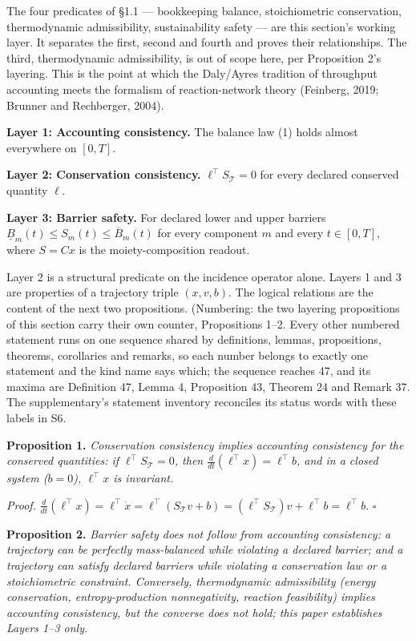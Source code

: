 \documentclass[11pt]{article}
\begin{document}
The four predicates of \S1.1 --- bookkeeping balance, stoichiometric conservation, thermodynamic admissibility, sustainability safety --- are this section's working layer. It separates the first, second and fourth and proves their relationships. The third, thermodynamic admissibility, is out of scope here, per Proposition 2's layering. This is the point at which the Daly/\allowbreak{}Ayres tradition of throughput accounting meets the formalism of reaction-network theory (Feinberg, 2019; Brunner and Rechberger, 2004).

\textbf{Layer 1: Accounting consistency.} The balance law (1) holds almost everywhere on \([0,T]\).

\textbf{Layer 2: Conservation consistency.} \(\ell^\top S_{\mathcal{T}} = 0\) for every declared conserved quantity \(\ell\).

\textbf{Layer 3: Barrier safety.} For declared lower and upper barriers \(\underline{B}_m(t) \le S_m(t) \le \overline{B}_m(t)\) for every component \(m\) and every \(t \in [0,T]\), where \(S = Cx\) is the moiety-composition readout.

Layer 2 is a structural predicate on the incidence operator alone. Layers 1 and 3 are properties of a trajectory triple \((x, v, b)\). The logical relations are the content of the next two propositions. (Numbering: the two layering propositions of this section carry their own counter, Propositions 1--2. Every other numbered statement runs on one sequence shared by definitions, lemmas, propositions, theorems, corollaries and remarks, so each number belongs to exactly one statement and the kind name says which; the sequence reaches 47, and its maxima are Definition 47, Lemma 4, Proposition 43, Theorem 24 and Remark 37. The supplementary's statement inventory reconciles its status words with these labels in S6.

\textbf{Proposition 1.} \emph{Conservation consistency implies accounting consistency for the conserved quantities: if \(\ell^\top S_{\mathcal{T}} = 0\), then \(\frac{d}{dt}(\ell^\top x) =\allowbreak{} \ell^\top b\), and in a closed system (\(b = 0\)), \(\ell^\top x\) is invariant.}

\emph{Proof.} \(\frac{d}{dt}(\ell^\top x) =\allowbreak{} \ell^\top \dot x =\allowbreak{} \ell^\top(S_{\mathcal{T}} v +\allowbreak{} b) =\allowbreak{} (\ell^\top S_{\mathcal{T}}) v +\allowbreak{} \ell^\top b =\allowbreak{} \ell^\top b\). \(\square\)

\textbf{Proposition 2.} \emph{Barrier safety does not follow from accounting consistency: a trajectory can be perfectly mass-balanced while violating a declared barrier; and a trajectory can satisfy declared barriers while violating a conservation law or a stoichiometric constraint. Conversely, thermodynamic admissibility (energy conservation, entropy-production nonnegativity, reaction feasibility) implies accounting consistency, but the converse does not hold; this paper establishes Layers 1--3 only.}
\end{document}
